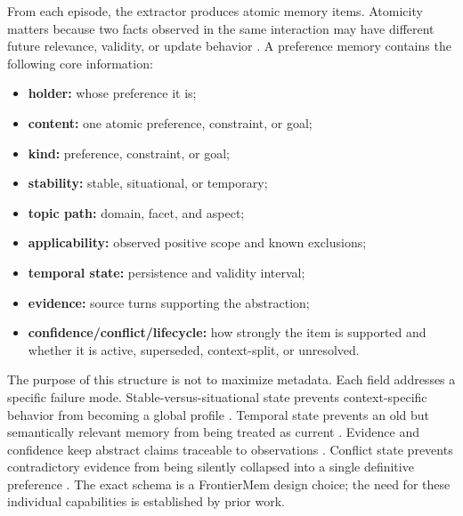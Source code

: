 \documentclass[11pt]{article}
\begin{document}
From each episode, the extractor produces atomic memory items. Atomicity matters because two facts observed in the same interaction may have different future relevance, validity, or update behavior \cite{wang2026qumem}. A preference memory contains the following core information:
\begin{itemize}
    \item \textbf{holder:} whose preference it is;
    \item \textbf{content:} one atomic preference, constraint, or goal;
    \item \textbf{kind:} preference, constraint, or goal;
    \item \textbf{stability:} stable, situational, or temporary;
    \item \textbf{topic path:} domain, facet, and aspect;
    \item \textbf{applicability:} observed positive scope and known exclusions;
    \item \textbf{temporal state:} persistence and validity interval;
    \item \textbf{evidence:} source turns supporting the abstraction;
    \item \textbf{confidence/conflict/lifecycle:} how strongly the item is supported and whether it is active, superseded, context-split, or unresolved.
\end{itemize}

The purpose of this structure is not to maximize metadata. Each field addresses a specific failure mode. Stable-versus-situational state prevents context-specific behavior from becoming a global profile \cite{gao2026s2pref}. Temporal state prevents an old but semantically relevant memory from being treated as current \cite{sun2026pamu,wang2026qumem}. Evidence and confidence keep abstract claims traceable to observations \cite{hou2026personatree}. Conflict state prevents contradictory evidence from being silently collapsed into a single definitive preference \cite{yang2026tangle}. The exact schema is a FrontierMem design choice; the need for these individual capabilities is established by prior work.
\end{document}
